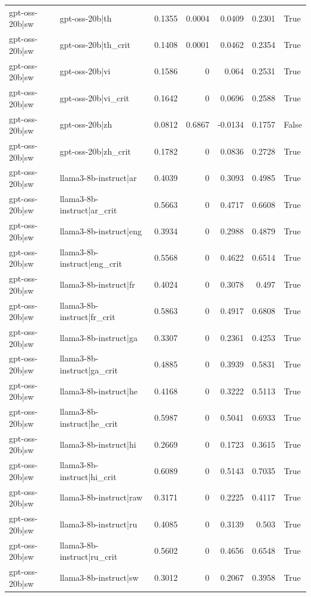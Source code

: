 \begin{table}
\begin{tabular}{l l r r r r l}
gpt-oss-20b|sw & gpt-oss-20b|th & 0.1355 & 0.0004 & 0.0409 & 0.2301 & True \\
gpt-oss-20b|sw & gpt-oss-20b|th_crit & 0.1408 & 0.0001 & 0.0462 & 0.2354 & True \\
gpt-oss-20b|sw & gpt-oss-20b|vi & 0.1586 & 0 & 0.064 & 0.2531 & True \\
gpt-oss-20b|sw & gpt-oss-20b|vi_crit & 0.1642 & 0 & 0.0696 & 0.2588 & True \\
gpt-oss-20b|sw & gpt-oss-20b|zh & 0.0812 & 0.6867 & -0.0134 & 0.1757 & False \\
gpt-oss-20b|sw & gpt-oss-20b|zh_crit & 0.1782 & 0 & 0.0836 & 0.2728 & True \\
gpt-oss-20b|sw & llama3-8b-instruct|ar & 0.4039 & 0 & 0.3093 & 0.4985 & True \\
gpt-oss-20b|sw & llama3-8b-instruct|ar_crit & 0.5663 & 0 & 0.4717 & 0.6608 & True \\
gpt-oss-20b|sw & llama3-8b-instruct|eng & 0.3934 & 0 & 0.2988 & 0.4879 & True \\
gpt-oss-20b|sw & llama3-8b-instruct|eng_crit & 0.5568 & 0 & 0.4622 & 0.6514 & True \\
gpt-oss-20b|sw & llama3-8b-instruct|fr & 0.4024 & 0 & 0.3078 & 0.497 & True \\
gpt-oss-20b|sw & llama3-8b-instruct|fr_crit & 0.5863 & 0 & 0.4917 & 0.6808 & True \\
gpt-oss-20b|sw & llama3-8b-instruct|ga & 0.3307 & 0 & 0.2361 & 0.4253 & True \\
gpt-oss-20b|sw & llama3-8b-instruct|ga_crit & 0.4885 & 0 & 0.3939 & 0.5831 & True \\
gpt-oss-20b|sw & llama3-8b-instruct|he & 0.4168 & 0 & 0.3222 & 0.5113 & True \\
gpt-oss-20b|sw & llama3-8b-instruct|he_crit & 0.5987 & 0 & 0.5041 & 0.6933 & True \\
gpt-oss-20b|sw & llama3-8b-instruct|hi & 0.2669 & 0 & 0.1723 & 0.3615 & True \\
gpt-oss-20b|sw & llama3-8b-instruct|hi_crit & 0.6089 & 0 & 0.5143 & 0.7035 & True \\
gpt-oss-20b|sw & llama3-8b-instruct|raw & 0.3171 & 0 & 0.2225 & 0.4117 & True \\
gpt-oss-20b|sw & llama3-8b-instruct|ru & 0.4085 & 0 & 0.3139 & 0.503 & True \\
gpt-oss-20b|sw & llama3-8b-instruct|ru_crit & 0.5602 & 0 & 0.4656 & 0.6548 & True \\
gpt-oss-20b|sw & llama3-8b-instruct|sw & 0.3012 & 0 & 0.2067 & 0.3958 & True \\

\end{tabular}
\end{table}
